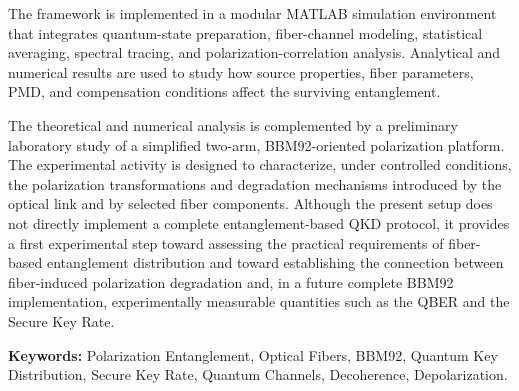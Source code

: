 The framework is implemented in a modular MATLAB simulation environment that integrates quantum-state preparation, 
fiber-channel modeling, statistical averaging, spectral tracing, and polarization-correlation analysis. 
Analytical and numerical results are used to study how source properties, fiber parameters, PMD, and 
compensation conditions affect the surviving entanglement.

The theoretical and numerical analysis is complemented by a preliminary laboratory study of a simplified two-arm, BBM92-oriented polarization platform. 
The experimental activity is designed to characterize, under controlled conditions, the polarization transformations 
and degradation mechanisms introduced by the optical link and by selected fiber components.
Although the present setup does not directly implement a complete entanglement-based QKD protocol, 
it provides a first experimental step toward assessing the practical requirements of fiber-based entanglement distribution and toward establishing the connection between 
fiber-induced polarization degradation and, in a future complete BBM92 implementation, experimentally measurable quantities such as the QBER and the Secure Key Rate.

\medskip
\noindent
\textbf{Keywords:}
Polarization Entanglement,
Optical Fibers,
BBM92,
Quantum Key Distribution,
Secure Key Rate,
Quantum Channels,
Decoherence,
Depolarization.
